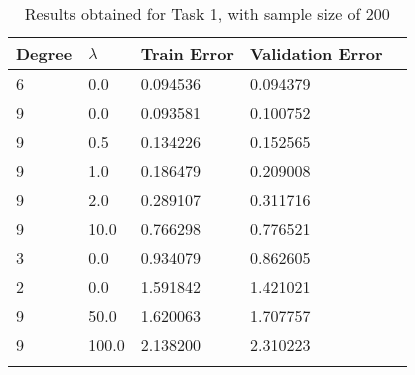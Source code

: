 \def\arraystretch{1.25}
\begin{longtable}{l l l l l}
\hline
\hline
\textbf{Degree} & \textbf{$\lambda$} & \textbf{Train Error} & \textbf{Validation Error} \\
\hline
\hline
6 & 0.0 & 0.094536 & 0.094379 \\
9 & 0.0 & 0.093581 & 0.100752 \\
9 & 0.5 & 0.134226 & 0.152565 \\
9 & 1.0 & 0.186479 & 0.209008 \\
9 & 2.0 & 0.289107 & 0.311716 \\
9 & 10.0 & 0.766298 & 0.776521 \\
3 & 0.0 & 0.934079 & 0.862605 \\
2 & 0.0 & 1.591842 & 1.421021 \\
9 & 50.0 & 1.620063 & 1.707757 \\
9 & 100.0 & 2.138200 & 2.310223 \\
\hline
\caption{Results obtained for Task 1, with sample size of 200}
\end{longtable}